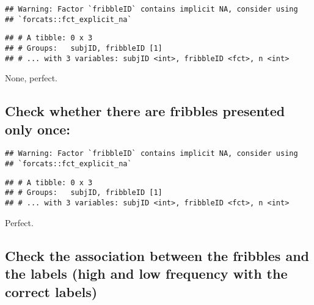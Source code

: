 \documentclass[
]{article}
\newenvironment{Shaded}{\begin{snugshade}}{\end{snugshade}}
\newcommand{\DecValTok}[1]{\textcolor[rgb]{0.00,0.00,0.81}{#1}}
\newcommand{\KeywordTok}[1]{\textcolor[rgb]{0.13,0.29,0.53}{\textbf{#1}}}
\newcommand{\NormalTok}[1]{#1}
\newcommand{\OperatorTok}[1]{\textcolor[rgb]{0.81,0.36,0.00}{\textbf{#1}}}
\newcommand{\StringTok}[1]{\textcolor[rgb]{0.31,0.60,0.02}{#1}}
\begin{document}
\begin{verbatim}
## Warning: Factor `fribbleID` contains implicit NA, consider using
## `forcats::fct_explicit_na`
\end{verbatim}

\begin{verbatim}
## # A tibble: 0 x 3
## # Groups:   subjID, fribbleID [1]
## # ... with 3 variables: subjID <int>, fribbleID <fct>, n <int>
\end{verbatim}

None, perfect.

\hypertarget{check-whether-there-are-fribbles-presented-only-once}{%
\subsection{Check whether there are fribbles presented only
once:}\label{check-whether-there-are-fribbles-presented-only-once}}

\begin{Shaded}
\end{Shaded}

\begin{verbatim}
## Warning: Factor `fribbleID` contains implicit NA, consider using
## `forcats::fct_explicit_na`
\end{verbatim}

\begin{verbatim}
## # A tibble: 0 x 3
## # Groups:   subjID, fribbleID [1]
## # ... with 3 variables: subjID <int>, fribbleID <fct>, n <int>
\end{verbatim}

Perfect.

\hypertarget{check-the-association-between-the-fribbles-and-the-labels-high-and-low-frequency-with-the-correct-labels}{%
\subsection{Check the association between the fribbles and the labels
(high and low frequency with the correct
labels)}\label{check-the-association-between-the-fribbles-and-the-labels-high-and-low-frequency-with-the-correct-labels}}
\end{document}
